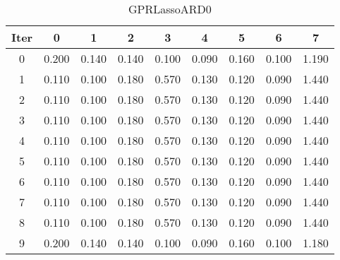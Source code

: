\begin{table}
	\begin{center}
		\begin{tabular}{|c|c|c|c|c|c|c|c|c|}
			\hline
			Iter & 0 & 1 & 2 & 3 & 4 & 5 & 6 & 7 \\
			\hline
			0 & 0.200 & 0.140 & 0.140 & 0.100 & 0.090 & 0.160 & 0.100 & 1.190 \\
			\hline
			1 & 0.110 & 0.100 & 0.180 & 0.570 & 0.130 & 0.120 & 0.090 & 1.440 \\
			\hline
			2 & 0.110 & 0.100 & 0.180 & 0.570 & 0.130 & 0.120 & 0.090 & 1.440 \\
			\hline
			3 & 0.110 & 0.100 & 0.180 & 0.570 & 0.130 & 0.120 & 0.090 & 1.440 \\
			\hline
			4 & 0.110 & 0.100 & 0.180 & 0.570 & 0.130 & 0.120 & 0.090 & 1.440 \\
			\hline
			5 & 0.110 & 0.100 & 0.180 & 0.570 & 0.130 & 0.120 & 0.090 & 1.440 \\
			\hline
			6 & 0.110 & 0.100 & 0.180 & 0.570 & 0.130 & 0.120 & 0.090 & 1.440 \\
			\hline
			7 & 0.110 & 0.100 & 0.180 & 0.570 & 0.130 & 0.120 & 0.090 & 1.440 \\
			\hline
			8 & 0.110 & 0.100 & 0.180 & 0.570 & 0.130 & 0.120 & 0.090 & 1.440 \\
			\hline
			9 & 0.200 & 0.140 & 0.140 & 0.100 & 0.090 & 0.160 & 0.100 & 1.180 \\
			\hline
		\end{tabular}
	\end{center}
	\caption{GPRLassoARD0}
\end{table}